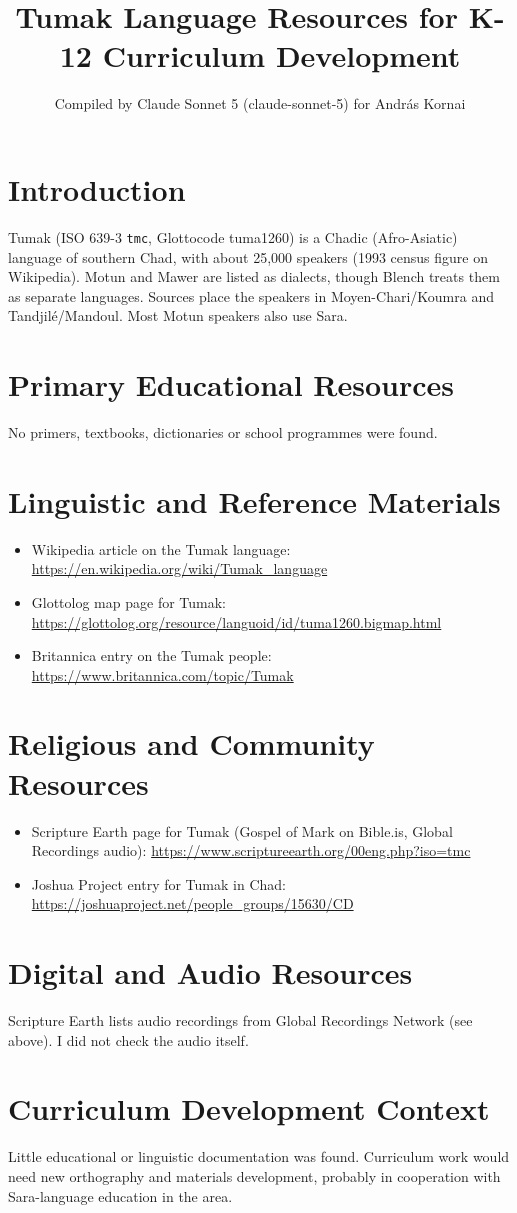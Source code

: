 \documentclass[12pt]{article}
\title{Tumak Language Resources for K-12 Curriculum Development}
\author{Compiled by Claude Sonnet 5 (claude-sonnet-5) for Andr\'as Kornai}
\date{}
\begin{document}
\maketitle

\section{Introduction}
Tumak (ISO 639-3 \texttt{tmc}, Glottocode tuma1260) is a Chadic (Afro-Asiatic) language of southern Chad, with about 25,000 speakers (1993 census figure on Wikipedia). Motun and Mawer are listed as dialects, though Blench treats them as separate languages. Sources place the speakers in Moyen-Chari/Koumra and Tandjil\'e/Mandoul. Most Motun speakers also use Sara.

\section{Primary Educational Resources}
No primers, textbooks, dictionaries or school programmes were found.

\section{Linguistic and Reference Materials}
\begin{itemize}
\item Wikipedia article on the Tumak language: \url{https://en.wikipedia.org/wiki/Tumak_language}
\item Glottolog map page for Tumak: \url{https://glottolog.org/resource/languoid/id/tuma1260.bigmap.html}
\item Britannica entry on the Tumak people: \url{https://www.britannica.com/topic/Tumak}
\end{itemize}

\section{Religious and Community Resources}
\begin{itemize}
\item Scripture Earth page for Tumak (Gospel of Mark on Bible.is, Global Recordings audio): \url{https://www.scriptureearth.org/00eng.php?iso=tmc}
\item Joshua Project entry for Tumak in Chad: \url{https://joshuaproject.net/people_groups/15630/CD}
\end{itemize}

\section{Digital and Audio Resources}
Scripture Earth lists audio recordings from Global Recordings Network (see above). I did not check the audio itself.

\section{Curriculum Development Context}
Little educational or linguistic documentation was found. Curriculum work would need new orthography and materials development, probably in cooperation with Sara-language education in the area.
\end{document}
